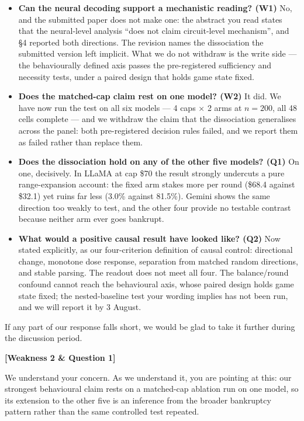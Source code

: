 \begin{itemize}
\item \textbf{Can the neural decoding support a mechanistic reading? (W1)} No, and the submitted
paper does not make one: the abstract you read states that the neural-level analysis ``does not
claim circuit-level mechanism'', and \S4 reported both directions. The revision names the
dissociation the submitted version left implicit. What we do not withdraw is the write side ---
the behaviourally defined axis passes the pre-registered sufficiency and necessity tests, under a paired design
that holds game state fixed.
\item \textbf{Does the matched-cap claim rest on one model? (W2)} It did. We have now run the
test on all six models --- 4 caps $\times$ 2 arms at $n = 200$, all 48 cells complete --- and we
withdraw the claim that the dissociation generalises across the panel: both pre-registered
decision rules failed, and we report them as failed rather than replace them.
\item \textbf{Does the dissociation hold on any of the other five models? (Q1)} On one,
decisively. In LLaMA at cap \$70 the result strongly undercuts a pure range-expansion account: the fixed arm stakes more per
round (\$68.4 against \$32.1) yet ruins far less (3.0\% against 81.5\%). Gemini shows the same
direction too weakly to test, and the other four provide no testable contrast because neither
arm ever goes bankrupt.
\item \textbf{What would a positive causal result have looked like? (Q2)} Now stated explicitly,
as our four-criterion definition of causal control: directional change, monotone dose response,
separation from matched random directions, and stable parsing. The readout does not meet all
four. The balance/round confound cannot reach the behavioural axis, whose paired design holds
game state fixed; the nested-baseline test your wording implies has not been run, and we will
report it by 3 August.
\end{itemize}

If any part of our response falls short, we would be glad to take it further during the
discussion period.

\vspace{0.6em}

\textbf{[Weakness 2 \& Question 1]}

We understand your concern. As we understand it, you are pointing at this: our strongest
behavioural claim rests on a matched-cap ablation run on one model, so its extension to the other
five is an inference from the broader bankruptcy pattern rather than the same controlled test
repeated.

